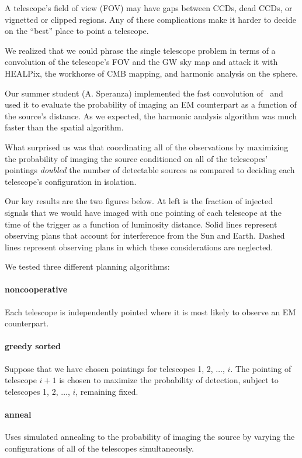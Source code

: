 \documentclass[portrait]{a0poster}
\begin{document}
A telescope’s field of view (FOV) may have gaps between CCDs, dead CCDs, or vignetted or clipped regions.  Any of these complications make it harder to decide on the “best” place to point a telescope.

We realized that we could phrase the single telescope problem in terms of a convolution of the telescope’s FOV and the GW sky map and attack it with HEALPix, the workhorse of CMB mapping, and harmonic analysis on the sphere.

Our summer student (A. Speranza) implemented the fast convolution of~\citet{Wandelt:2001p13439} and used it to evaluate the probability of imaging an EM counterpart as a function of the source’s distance.  As we expected, the harmonic analysis algorithm was much faster than the spatial algorithm.

What surprised us was that coordinating all of the observations by maximizing the probability of imaging the source conditioned on all of the telescopes’ pointings \emph{doubled} the number of detectable sources as compared to deciding each telescope’s configuration in isolation.

\framebreak

Our key results are the two figures below.  At left is the fraction of injected signals that we would have imaged with one pointing of each telescope at the time of the trigger as a function of luminosity distance.  Solid lines represent observing plans that account for interference from the Sun and Earth.  Dashed lines represent observing plans in which these considerations are neglected.

We tested three different planning algorithms:

\paragraph{\color{red}noncooperative}
Each telescope is independently pointed where it is most likely to observe an EM counterpart.

\paragraph{\color{green!50!black}greedy sorted}
Suppose that we have chosen pointings for telescopes 1, 2, $\dots$, $i$.  The pointing of telescope $i+1$ is chosen to maximize the probability of detection, subject to telescopes 1, 2, $\dots$, $i$, remaining fixed.

\paragraph{\color{blue}anneal}
Uses simulated annealing to the probability of imaging the source by varying the configurations of all of the telescopes simultaneously.
\end{document}
